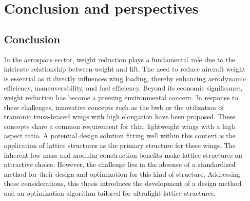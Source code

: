 \setchapterpreamble[u]{\margintoc}
\glsresetall %

\chapter*{Conclusion and perspectives}
{}
%

\section*{Conclusion}
In the aerospace sector, weight reduction plays a fundamental role due to the intricate relationship between weight and lift. The need to reduce aircraft weight is essential as it directly influences wing loading, thereby enhancing aerodynamic efficiency, maneuverability, and fuel efficiency. Beyond its economic significance, weight reduction has become a pressing environmental concern. In response to these challenges, innovative concepts such as the \gls{bwb} or the utilization of transonic truss-braced wings with high elongation have been proposed. These concepts share a common requirement for thin, lightweight wings with a high aspect ratio. A potential design solution fitting well within this context is the application of lattice structures as the primary structure for these wings. The inherent low mass and modular construction benefits make lattice structures an attractive choice. However, the challenge lies in the absence of a standardized method for their design and optimization for this kind of structure. Addressing these considerations, this thesis introduces the development of a design method and an optimization algorithm tailored for ultralight lattice structures.


